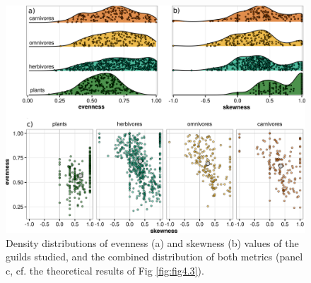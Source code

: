 \begin{figure}[ht!]
\includegraphics[width=\textwidth,height=\textheight,keepaspectratio]{./Figures/chapter04/Fig_4.png}
\caption[Evenness and skewness in empirical guilds]{\color{Gray}Density distributions of evenness (a) and skewness (b) values of the guilds studied, and the combined distribution of both metrics (panel c, cf. the theoretical results of Fig \ref{fig:fig4.3}).}\label{fig:fig4.4}
\end{figure}

